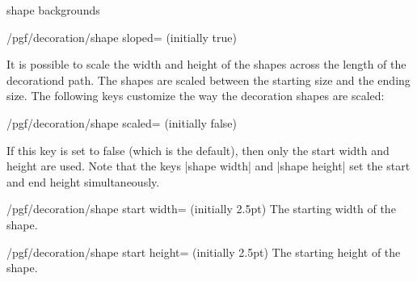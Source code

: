 \begin{decoration}{shape backgrounds}
\begin{key}{/pgf/decoration/shape sloped= (initially true)}
\begin{codeexample}[]
\end{codeexample}
  \end{key}%

  It is possible to scale the width and height of the shapes across the
  length of the decorationd path. The shapes are scaled between the starting
  size and the ending size. The following keys customize the way the
  decoration shapes are scaled:
	
  \begin{key}{/pgf/decoration/shape scaled= (initially false)}
\begin{codeexample}[]
\end{codeexample}

    If this key is set to false (which is the default), then only the
    start width and height are used. Note that the keys |shape width|
    and |shape height| set the start and end height simultaneously.
  \end{key}

  \begin{key}{/pgf/decoration/shape start width= (initially 2.5pt)}
    The starting width of the shape.
  \end{key}%

  \begin{key}{/pgf/decoration/shape start height= (initially 2.5pt)}
    The starting height of the shape.
  \end{key}%
  

\end{decoration}
